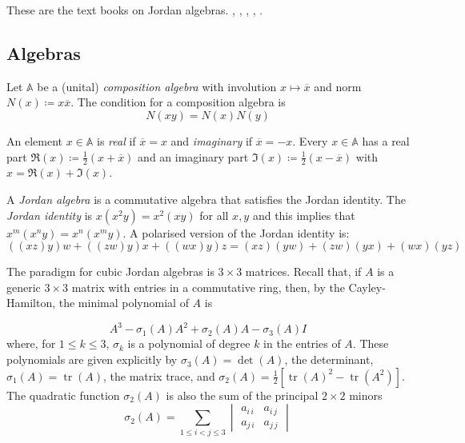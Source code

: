 \documentclass[12pt]{amsart}
\DeclareMathOperator{\tr}{tr}
\newcommand{\Dfn}[1]{\emph{\color{blue}#1}}
\newcommand\bA{\mathbb{A}}
\begin{document}
 
These are the text books on Jordan algebras.
\cite{jacobson1968}, \cite{springer1997}, \cite{knus1998}, \cite[Part~II~4]{mccrimmon2004}, \cite[VI]{garibaldi2024}.


\subsection{Algebras}
Let $\bA$ be a (unital) \Dfn{composition algebra} with involution $x\mapsto \overline{x}$ and norm $N(x)\coloneqq x\overline{x}$. The condition for a composition algebra is
\begin{equation*}
	N(xy) = N(x)N(y)
\end{equation*}

An element $x\in \bA$ is \Dfn{real} if $\overline{x}=x$ and \Dfn{imaginary} if
$\overline{x}=-x$. Every $x\in \bA$ has a real part $\Re(x)\coloneqq \frac12(x+\overline{x})$
and an imaginary part $\Im(x)\coloneqq \frac12(x-\overline{x})$ with $x=\Re(x)+\Im(x)$.

A \Dfn{Jordan algebra} is a commutative algebra that satisfies the Jordan identity.
The \Dfn{Jordan identity} is $x(x^2y) = x^2(xy)$ for all $x,y$ and this implies that $x^m(x^ny)=x^n(x^my)$.
A polarised version of the Jordan identity is:
\begin{equation*}
	((xz)y)w+((zw)y)x+((wx)y)z=(xz)(yw)+(zw)(yx)+(wx)(yz)
\end{equation*}

The paradigm for cubic Jordan algebras is $3\times 3$ matrices.
Recall that, if $A$ is a generic $3\times 3$ matrix with entries in a commutative ring, then, by the Cayley-Hamilton, the minimal polynomial of $A$ is

\begin{equation*}
	A^3 - \sigma_1(A) A^2 + \sigma_2(A)A - \sigma_3(A)I
\end{equation*}
where, for $1\leqslant k\leqslant 3$, $\sigma_k$ is a polynomial of degree $k$ in the entries of $A$.
These polynomials are given explicitly by $\sigma_3(A) = \det(A)$, the determinant, $\sigma_1(A) = \tr(A)$, the matrix trace, and $\sigma_2(A) = \frac12 \left[ \tr(A)^2 - \tr(A^2)\right]$. The quadratic function $\sigma_2(A)$
is also the sum of the principal $2\times 2$ minors
\begin{equation*}
	\sigma_2(A) = \sum_{1\leqslant i<j \leqslant 3} \begin{vmatrix}
	a_{i\,i} & a_{i\,j} \\ a_{j\,i} & a_{j\,j}
\end{vmatrix}
\end{equation*}
\end{document}
